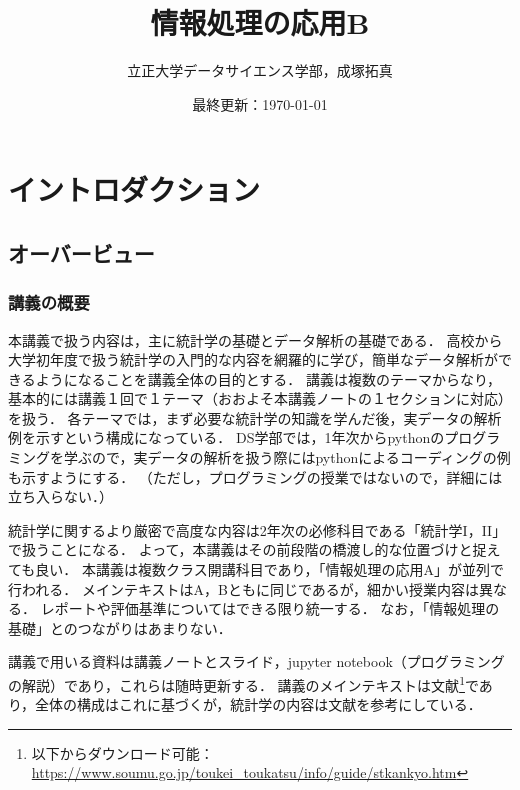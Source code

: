 
\graphicspath{{./figure/}} %



\title{\Huge \textbf{情報処理の応用B}}
\author{立正大学データサイエンス学部，成塚拓真}
\date{最終更新：\today}



\maketitle
\tableofcontents \clearpage%

\chapter{イントロダクション}

\section{オーバービュー}

\subsection{講義の概要}
%
本講義で扱う内容は，主に統計学の基礎とデータ解析の基礎である．
%
高校から大学初年度で扱う統計学の入門的な内容を網羅的に学び，簡単なデータ解析ができるようになることを講義全体の目的とする．
%
講義は複数のテーマからなり，基本的には講義１回で１テーマ（おおよそ本講義ノートの１セクションに対応）を扱う．
%
各テーマでは，まず必要な統計学の知識を学んだ後，実データの解析例を示すという構成になっている．
%
DS学部では，1年次からpythonのプログラミングを学ぶので，実データの解析を扱う際にはpythonによるコーディングの例も示すようにする．
%
（ただし，プログラミングの授業ではないので，詳細には立ち入らない．）
%

%
統計学に関するより厳密で高度な内容は2年次の必修科目である「統計学I，II」で扱うことになる．
%
よって，本講義はその前段階の橋渡し的な位置づけと捉えても良い．
%
本講義は複数クラス開講科目であり，「情報処理の応用A」が並列で行われる．
%
メインテキストはA，Bともに同じであるが，細かい授業内容は異なる．
%
レポートや評価基準についてはできる限り統一する．
%
なお，「情報処理の基礎」とのつながりはあまりない．
%

%
講義で用いる資料は講義ノートとスライド，jupyter notebook（プログラミングの解説）であり，これらは随時更新する．
%
講義のメインテキストは文献\cite{a}\footnote{以下からダウンロード可能：\url{https://www.soumu.go.jp/toukei_toukatsu/info/guide/stkankyo.htm}}であり，全体の構成はこれに基づくが，統計学の内容は文献\cite{b,e,f,g}を参考にしている．
%

